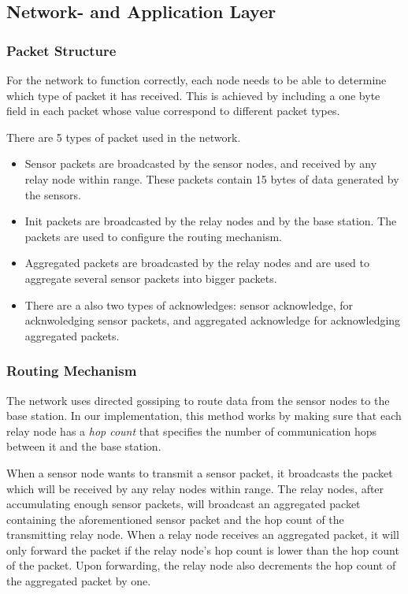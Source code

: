 \documentclass[conference]{IEEEtran}
\begin{document}
\subsection{Network- and Application Layer}

\subsubsection{Packet Structure}

For the network to function correctly, each node needs to be able to determine
which type of packet it has received. This is achieved by including a one
byte field in each packet whose value correspond to different packet types.

There are 5 types of packet used in the network.
\begin{itemize}
    \item Sensor packets are broadcasted by the sensor nodes, and received
    by any relay node within range. These packets contain 15 bytes of data
    generated by the sensors.
    \item Init packets are broadcasted by the relay nodes and by the base
    station. The packets are used to configure the routing mechanism.
    \item Aggregated packets are broadcasted by the relay nodes and are
    used to aggregate several sensor packets into bigger packets.
    \item There are a also two types of acknowledges: sensor acknowledge, for
    acknwoledging sensor packets, and aggregated acknowledge for acknowledging
    aggregated packets.
\end{itemize}

\subsubsection{Routing Mechanism}

The network uses directed gossiping to route data from the sensor nodes to the
base station. In our implementation, this method works by making sure that each
relay node has a \emph{hop count} that specifies the number of communication
hops between it and the base station.

When a sensor node wants to transmit a sensor packet, it broadcasts the packet
which will be received by any relay nodes within range. The relay nodes, after
accumulating enough sensor packets, will broadcast an aggregated packet
containing the aforementioned sensor packet and the hop count of the
transmitting relay node. When a relay node receives an aggregated packet, it
will only forward the packet if the relay node's hop count is lower than the
hop count of the packet. Upon forwarding, the relay node also decrements the
hop count of the aggregated packet by one.
\end{document}
